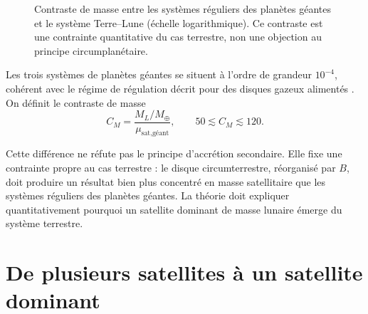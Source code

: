 \documentclass[11pt,a4paper,openany]{report}
\newcommand{\Mt}{M_{\oplus}}
\begin{document}
\begin{figure}[htbp]
\centering
{}
\caption{Contraste de masse entre les systèmes réguliers des planètes géantes et le système
Terre--Lune (échelle logarithmique). Ce contraste est une contrainte quantitative du cas
terrestre, non une objection au principe circumplanétaire.}
\label{fig:contraste}
\end{figure}

Les trois systèmes de planètes géantes se situent à l'ordre de grandeur $10^{-4}$, cohérent avec
le régime de régulation décrit pour des disques gazeux alimentés \cite{CanupWard2006}. On
définit le contraste de masse
\begin{equation}
C_M=\frac{M_L/\Mt}{\mu_{\text{sat,géant}}},
\qquad 50\lesssim C_M\lesssim 120.
\label{eq:CM}
\end{equation}

\begin{controle}
Cette différence ne réfute pas le principe d'accrétion secondaire. Elle fixe une contrainte
propre au cas terrestre : le disque circumterrestre, réorganisé par $B$, doit produire un résultat
bien plus concentré en masse satellitaire que les systèmes réguliers des planètes géantes. La
théorie doit expliquer quantitativement pourquoi un satellite dominant de masse lunaire émerge
du système terrestre.
\end{controle}

\section{De plusieurs satellites à un satellite dominant}
\end{document}
